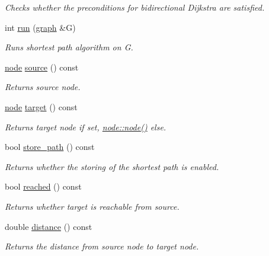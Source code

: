 \begin{DoxyCompactItemize}
\begin{DoxyCompactList}\small\item\em Checks whether the preconditions for bidirectional Dijkstra are satisfied. \end{DoxyCompactList}\item 
int \mbox{\hyperlink{classbid__dijkstra_a1d2f36d3977ef90285442a269a03b919}{run}} (\mbox{\hyperlink{classgraph}{graph}} \&G)
\begin{DoxyCompactList}\small\item\em Runs shortest path algorithm on {\ttfamily G}. \end{DoxyCompactList}\item 
\mbox{\hyperlink{classnode}{node}} \mbox{\hyperlink{classbid__dijkstra_ae8f5268e008b003e38f25c83ed3fd138}{source}} () const
\begin{DoxyCompactList}\small\item\em Returns source node. \end{DoxyCompactList}\item 
\mbox{\hyperlink{classnode}{node}} \mbox{\hyperlink{classbid__dijkstra_a5d32d74a93c1be5581f56ba3a2839ff5}{target}} () const
\begin{DoxyCompactList}\small\item\em Returns target node if set, {\ttfamily \mbox{\hyperlink{classnode_a6da4ea35f222059db9a59cf40be459f9}{node\+::node()}}} else. \end{DoxyCompactList}\item 
bool \mbox{\hyperlink{classbid__dijkstra_ad9716d8f542f07e5696aba778417cc12}{store\+\_\+path}} () const
\begin{DoxyCompactList}\small\item\em Returns whether the storing of the shortest path is enabled. \end{DoxyCompactList}\item 
bool \mbox{\hyperlink{classbid__dijkstra_a97f599b54fe9b030d87474898ff4a64c}{reached}} () const
\begin{DoxyCompactList}\small\item\em Returns whether target is reachable from source. \end{DoxyCompactList}\item 
double \mbox{\hyperlink{classbid__dijkstra_a6150beb75d59f16d0332f42d5ff7e3f3}{distance}} () const
\begin{DoxyCompactList}\small\item\em Returns the distance from source node to target node. \end{DoxyCompactList}\item 

\end{DoxyCompactItemize}
